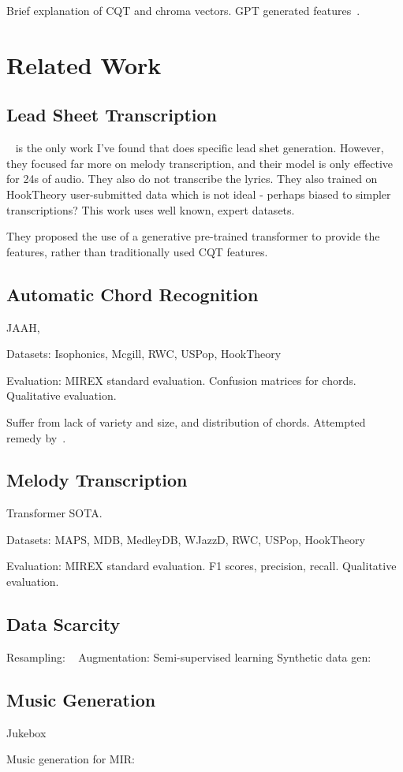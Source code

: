 Brief explanation of CQT and chroma vectors. GPT generated features~\cite{MelodyTranscriptionViaGenerativePreTraining}.

\section{Related Work}

\subsection{Lead Sheet Transcription}

~\cite{MelodyTranscriptionViaGenerativePreTraining} is the only work I've found that does specific lead shet generation. However, they focused far more on melody transcription, and their model is only effective for 24s of audio. They also do not transcribe the lyrics. They also trained on HookTheory user-submitted data which is not ideal - perhaps biased to simpler transcriptions? This work uses well known, expert datasets.

They proposed the use of a generative pre-trained transformer to provide the features, rather than traditionally used CQT features.

\subsection{Automatic Chord Recognition}

JAAH,

Datasets: Isophonics, Mcgill, RWC, USPop, HookTheory

Evaluation: MIREX standard evaluation. Confusion matrices for chords. Qualitative evaluation.

Suffer from lack of variety and size, and distribution of chords. Attempted remedy by~\cite{BalanceACRRandomForests}.

\subsection{Melody Transcription}

Transformer SOTA. 

Datasets: MAPS, MDB, MedleyDB, WJazzD, RWC, USPop, HookTheory

Evaluation: MIREX standard evaluation. F1 scores, precision, recall. Qualitative evaluation.

\subsection{Data Scarcity}

Resampling: ~\cite{BalanceACRRandomForests}
Augmentation:
Semi-supervised learning
Synthetic data gen:

\subsection{Music Generation}

Jukebox~\cite{Jukebox}

Music generation for MIR:~\cite{MusicGenTrainingData}
